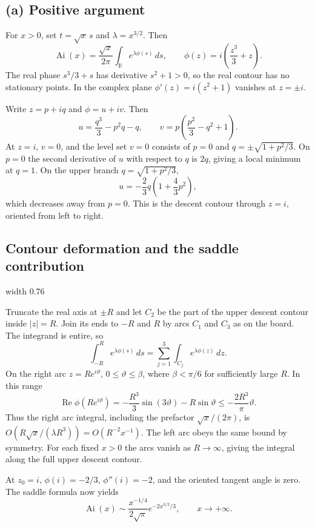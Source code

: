 \documentclass[11pt,a4paper]{article}
\begin{document}
\subsection*{(a) Positive argument}
For $x>0$, set $t=\sqrt{x}\,s$ and $\lambda=x^{3/2}$. Then
\[
    \operatorname{Ai}(x)=\frac{\sqrt{x}}{2\pi}
        \int_{\mathbb R} e^{\lambda\phi(s)}\,ds,\qquad
    \phi(z)=i\left(\frac{z^3}{3}+z\right).
\]
The real phase $s^3/3+s$ has derivative $s^2+1>0$, so the real
contour has no stationary points. In the complex plane
$\phi'(z)=i(z^2+1)$ vanishes at $z=\pm i$.

Write $z=p+iq$ and $\phi=u+iv$. Then
\[
    u=\frac{q^3}{3}-p^2q-q,\qquad
    v=p\left(\frac{p^2}{3}-q^2+1\right).
\]
At $z=i$, $v=0$, and the level set $v=0$ consists of $p=0$ and
$q=\pm\sqrt{1+p^2/3}$. On $p=0$ the second derivative of $u$ with
respect to $q$ is $2q$, giving a local minimum at $q=1$. On the
upper branch $q=\sqrt{1+p^2/3}$,
\[
    u=-\frac23q\left(1+\frac43p^2\right),
\]
which decreases away from $p=0$. This is the descent contour through
$z=i$, oriented from left to right.

\clearpage
\subsection*{Contour deformation and the saddle contribution}
\begin{center}
    \pdfximage width 0.76\linewidth {figures/asymptotic-lecture11/airy-contour.png}
    \leavevmode\pdfrefximage\pdflastximage
\end{center}
\noindent Truncate the real axis at $\pm R$ and let $C_2$ be the part
of the upper descent contour inside $|z|=R$. Join its ends to
$-R$ and $R$ by arcs $C_1$ and $C_3$ as on the board. The integrand
is entire, so
\[
    \int_{-R}^{R}e^{\lambda\phi(s)}\,ds
    =\sum_{j=1}^3\int_{C_j}e^{\lambda\phi(z)}\,dz.
\]
On the right arc $z=Re^{i\vartheta}$, $0\le\vartheta\le\beta$, where
$\beta<\pi/6$ for sufficiently large $R$. In this range
\[
    \operatorname{Re}\phi(Re^{i\vartheta})
        =-\frac{R^3}{3}\sin(3\vartheta)-R\sin\vartheta
        \le -\frac{2R^3}{\pi}\vartheta.
\]
Thus the right arc integral, including the prefactor
$\sqrt{x}/(2\pi)$, is $O(R\sqrt{x}/(\lambda R^3))=O(R^{-2}x^{-1})$.
The left arc obeys the same bound by symmetry. For each fixed $x>0$
the arcs vanish as $R\to\infty$, giving the integral along the full
upper descent contour.

At $z_0=i$, $\phi(i)=-2/3$, $\phi''(i)=-2$, and the oriented tangent
angle is zero. The saddle formula now yields
\[
    \boxed{\operatorname{Ai}(x)\sim
        \frac{x^{-1/4}}{2\sqrt{\pi}}e^{-2x^{3/2}/3}},
    \qquad x\to+\infty.
\]
\end{document}
